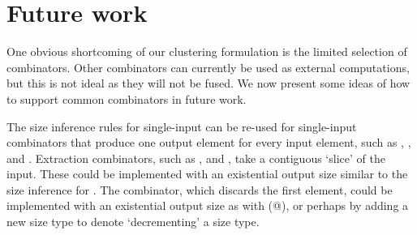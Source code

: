 

\section{Future work}
\label{clustering:s:FutureWork}


One obvious shortcoming of our clustering formulation is the limited selection of combinators.
Other combinators can currently be used as external computations, but this is not ideal as they will not be fused.
We now present some ideas of how to support common combinators in future work.

The size inference rules for single-input \Hs@map@ can be re-used for single-input combinators that produce one output element for every input element, such as \Hs@postscanl@, \Hs@prescanl@, and \Hs@indexed@.
Extraction combinators, such as \Hs@slice@, \Hs@take@ and \Hs@drop@, take a contiguous `slice' of the input.
These could be implemented with an existential output size similar to the size inference for \Hs@filter@.
The \Hs@tail@ combinator, which discards the first element, could be implemented with an existential output size as with (@), or perhaps by adding a new size type to denote `decrementing' a size type.

